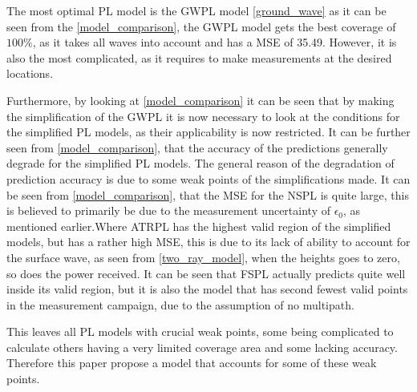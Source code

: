 The most optimal PL model is the GWPL model \eqref{ground_wave} as it can be seen from the  \autoref{model_comparison}, the GWPL model gets the best coverage of $100\%$, as it takes all waves into account and has a MSE of 35.49. However, it is also the most complicated, as it requires to make measurements at the desired locations.

Furthermore, by looking at \autoref{model_comparison} it can be seen that by making the simplification of the GWPL it is now necessary to look at the conditions for the simplified PL models, as their applicability is now restricted. It can be further seen from \autoref{model_comparison}, that the accuracy of the predictions generally degrade for the simplified PL models. The general reason of the degradation of prediction accuracy is due to some weak points of the simplifications made. It can be seen from \autoref{model_comparison}, that the MSE for the NSPL is quite large, this is believed to primarily be due to the measurement uncertainty of $\epsilon_{0}$, as mentioned earlier.Where ATRPL has the highest valid region of the simplified models, but has a rather high MSE, this is due to its lack of ability to account for the surface wave, as seen from \eqref{two_ray_model}, when the heights goes to zero, so does the power received. It can be seen that FSPL actually predicts quite well inside its valid region, but it is also the model that has second fewest valid points in the measurement campaign, due to the assumption of no multipath. 

This leaves all PL models with crucial weak points, some being complicated to calculate others having a very limited coverage area and some lacking accuracy. Therefore this paper propose a model that accounts for some of these weak points. 





